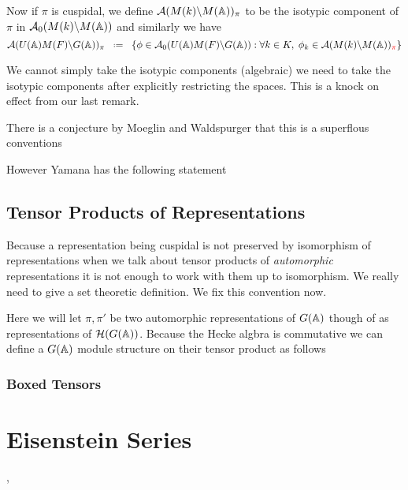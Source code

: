 Now if \(\pi\) is cuspidal, we define \(\mathcal{A}(M(k) \backslash M(\A))_\pi\) to be the isotypic component of \(\pi\) in \(\mathcal{A}_0(M(k) \backslash M(\A))\) and similarly we have 
\[\mathcal{A}(U(\A)M(F) \backslash G(\A))_\pi \defeq \{\phi \in \mathcal{A}_0(U(\A)M(F) \backslash G(\A)) : \forall k\in K, \; \phi_k\in\mathcal{A}(M(k) \backslash M(\A))_{\textcolor{red}{\pi}} \}\]
\begin{Remark}
    We cannot simply take the isotypic components (algebraic) we need to take the isotypic components after explicitly restricting the spaces. This is a knock on effect from our last remark.
\end{Remark}

There is a conjecture by Moeglin and Waldspurger that this is a superflous conventions 

However Yamana has the following statement 



\subsection{Tensor Products of Representations}
Because a representation being cuspidal is not preserved by isomorphism of representations when we talk about tensor products of \textit{automorphic}  representations it is not enough to work with them up to isomorphism. We really need to give a set theoretic definition. We fix this convention now. 

Here we will let \(\pi, \pi'\) be two automorphic representations of \(G(\A)\) though of as representations of \(\mathcal{H}(G(\A))\). Because the Hecke algbra is commutative  we can define a \(G(\A)\) module structure on their tensor product as follows

\subsubsection{Boxed Tensors}

\section{Eisenstein Series}
\cite{lapidPerspectivesEisensteinSeries2022}, \cite{arthurEisensteinSeriesTrace1979}

